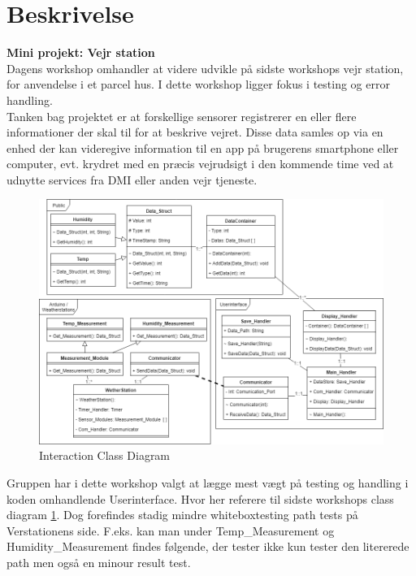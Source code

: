 \documentclass[11pt]{article}
\renewcommand{\baselinestretch}{1.20}
\begin{document}
    
    
    
    \renewcommand{\baselinestretch}{0.8}
    \tableofcontents
    \renewcommand{\baselinestretch}{1.20}
    \newpage
    
    \section{Beskrivelse}
    \textbf{Mini projekt: Vejr station}\\
    Dagens workshop omhandler at videre udvikle på sidste workshops vejr station, for anvendelse i et parcel hus. I dette workshop ligger fokus i testing og error handling.\\
    Tanken bag projektet er at forskellige sensorer registrerer en eller flere informationer der skal til for at beskrive vejret. Disse data samles op via en enhed der kan videregive information til en app på brugerens smartphone eller computer, evt. krydret med en præcis vejrudsigt i den kommende time ved at udnytte services fra DMI
    eller anden vejr tjeneste.
    
    \begin{figure}[H]
        \centering
        \includegraphics[width=1\textwidth,angle=0]{Struktureret_System_Udvikling/Workshop_2/Assets/Workshop2_ClassDiagram.png}
        \caption{Interaction Class Diagram}
        \label{fig:ClassDiagram}
    \end{figure}
    \noindent
    Gruppen har i dette workshop valgt at lægge mest vægt på testing og handling i koden omhandlende Userinterface. Hvor her referere til sidste workshops class diagram \ref{fig:ClassDiagram}.
    Dog forefindes stadig mindre whiteboxtesting path tests på Verstationens side. F.eks. kan man under Temp\_Measurement og Humidity\_Measurement findes følgende, der tester ikke kun tester den litererede path men også en minour result test.
    
\end{document}
